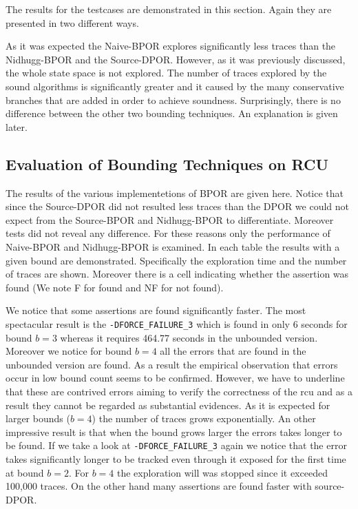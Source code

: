 The results for the testcases are demonstrated in this section. Again they are presented in two different ways.


As it was expected the Naive-BPOR explores significantly less traces than the Nidhugg-BPOR and the Source-DPOR. However,
as it was previously discussed, the whole state space is not explored. The number of traces explored by the sound
algorithms is significantly greater and it caused by the many conservative branches that are added in order to achieve
soundness. Surprisingly, there is no difference between the other two bounding techniques. An explanation is given
later.

\subsection{Evaluation of Bounding Techniques on RCU}
The results of the various implementetions of BPOR are given here. Notice that since the Source-DPOR did not resulted
less traces than the DPOR we could not expect from the Source-BPOR and Nidhugg-BPOR to differentiate. Moreover tests did not
reveal any difference. For these reasons only the performance of Naive-BPOR and Nidhugg-BPOR is examined. In each table the
results with a given bound are demonstrated. Specifically the exploration time and the number of traces are shown.
Moreover there is a cell indicating whether the assertion was found (We note F for found and NF for not found).




We notice that some assertions are found significantly faster. The most spectacular result is the
\verb|-DFORCE_FAILURE_3| which is found in only 6 seconds for bound $b=3$ whereas it requires 464.77 seconds in the
unbounded version. Moreover we notice for bound $b=4$ all the errors that are found in the unbounded version are found. As
a result the empirical observation that errors occur in low bound count seems to be confirmed. However, we have to
underline that these are contrived errors aiming to verify the correctness of the rcu and as a result they cannot be
regarded as substantial evidences. As it is expected for larger bounds ($b=4$) the number of traces grows exponentially.
An other impressive result is that when the bound grows larger the errors takes longer to be found. If we take a look at
\verb|-DFORCE_FAILURE_3| again we notice that the error takes significantly longer to be tracked even through it exposed
for the first time at bound $b=2$. For $b=4$ the exploration will was stopped since it exceeded 100,000 traces. On the other
hand many assertions are found faster with source-DPOR.

